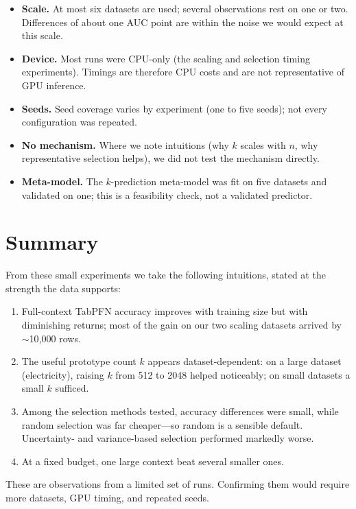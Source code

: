 \documentclass[11pt,a4paper]{article}
\begin{document}
\begin{itemize}
\item \textbf{Scale.} At most six datasets are used; several observations rest
on one or two. Differences of about one AUC point are within the noise we would
expect at this scale.
\item \textbf{Device.} Most runs were CPU-only (the scaling and selection
timing experiments). Timings are therefore CPU costs and are not representative
of GPU inference.
\item \textbf{Seeds.} Seed coverage varies by experiment (one to five seeds);
not every configuration was repeated.
\item \textbf{No mechanism.} Where we note intuitions (why $k$ scales with $n$,
why representative selection helps), we did not test the mechanism directly.
\item \textbf{Meta-model.} The $k$-prediction meta-model was fit on five
datasets and validated on one; this is a feasibility check, not a validated
predictor.
\end{itemize}

\section{Summary}

From these small experiments we take the following intuitions, stated at the
strength the data supports:

\begin{enumerate}
\item Full-context TabPFN accuracy improves with training size but with
diminishing returns; most of the gain on our two scaling datasets arrived by
$\sim$10{,}000 rows.
\item The useful prototype count $k$ appears dataset-dependent: on a large
dataset (electricity), raising $k$ from 512 to 2048 helped noticeably; on small
datasets a small $k$ sufficed.
\item Among the selection methods tested, accuracy differences were small,
while random selection was far cheaper---so random is a sensible default.
Uncertainty- and variance-based selection performed markedly worse.
\item At a fixed budget, one large context beat several smaller ones.
\end{enumerate}

These are observations from a limited set of runs. Confirming them would require
more datasets, GPU timing, and repeated seeds.
\end{document}
